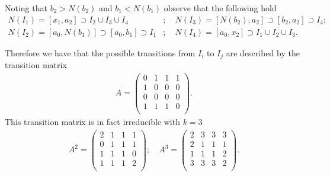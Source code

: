 \begin{ex}
Noting that $b_2 > N(b_2)$ and $b_1 < N(b_1)$ observe that the following hold
\begin{align}
	N(I_1) = [x_1, a_2] \supset I_2 \cup I_3 \cup I_4&; \quad	
	N(I_3) = [N(b_2), a_2] \supset [b_2, a_2] \supset I_4;\\
	N(I_2) = [a_0, N(b_1)] \supset [a_0, b_1] \supset I_1&;\quad
	N(I_4) = [a_0, x_2] \supset I_1 \cup I_2 \cup I_3.
\end{align}
\end{ex}
Therefore we have that the possible transitions from $I_{i}$ to $I_{j}$ are described by the transition matrix
\begin{align}
	A = 
	\begin{pmatrix}
		0 & 1 & 1 & 1 \\
		1 & 0 & 0 & 0 \\
		0 & 0 & 0 & 0 \\
		1 & 1 & 1 & 0 \\
	\end{pmatrix}
.	
\end{align}
This transition matrix is in fact irreducible with $k=3$
\begin{align}
	A^2 = 
	\begin{pmatrix}
		2 & 1 & 1 & 1 \\
		0 & 1 & 1 & 1 \\
		1 & 1 & 1 & 0 \\
		1 & 1 & 1 & 2 \\
	\end{pmatrix}
;\quad	
	A^3 = 
	\begin{pmatrix}
		2 & 3 & 3 & 3 \\
		2 & 1 & 1 & 1 \\
		1 & 1 & 1 & 2 \\
		3 & 3 & 3 & 2 \\
	\end{pmatrix}
	.
\end{align}

